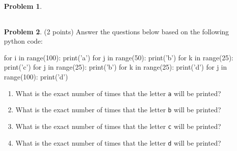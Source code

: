\documentclass[10pt]{article}
\theoremstyle{definition}
\newtheorem{problem}{Problem}
\begin{document}
\begin{problem}
{\begin{tabular}{c c c c c c}
\end{tabular}
}

\end{problem}


\newpage
\begin{problem}
(2 points)
Answer the questions below based on the following python code:
\begin{python}
for i in range(100):
    print('a')
    for j in range(50):
        print('b')
        for k in range(25):
            print('c')
    for j in range(25):
        print('b')
    for k in range(25):
        print('d')
for j in range(100):
    print('d')
\end{python}
\begin{enumerate}
    \item What is the exact number of times that the letter \texttt{a} will be printed?
        \vspace{1.5in}
    \item What is the exact number of times that the letter \texttt{b} will be printed?
        \vspace{1.5in}
    \item What is the exact number of times that the letter \texttt{c} will be printed?
        \vspace{1.5in}
    \item What is the exact number of times that the letter \texttt{d} will be printed?
        \vspace{1.5in}
\end{enumerate}
\end{problem}
\end{document}
